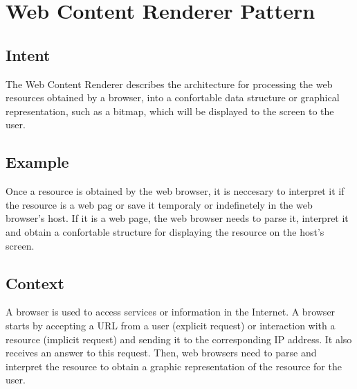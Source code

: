 \documentclass[prodmode,acmtecs]{acmsmall}
\begin{document}
\section{Web Content Renderer Pattern}

  \subsection*{Intent}

  The Web Content Renderer describes the architecture for processing the web resources obtained by a browser, into a confortable data structure \cite{gpuchrome} or graphical representation, such as a bitmap, which will be displayed to the screen to the user.

  \subsection*{Example}
  Once a resource is obtained by the web browser, it is neccesary to interpret it if the resource is a web pag or save it temporaly or indefinetely in the web browser's host. If it is a web page, the web browser needs to parse it, interpret it and obtain a confortable structure for displaying the resource on the host's screen.
  
  \subsection*{Context}
  A browser is used to access services or information in the Internet. A browser starts by accepting a URL from a user (explicit request) or interaction with a resource (implicit request) and sending it to the corresponding IP address. It also receives an answer to this request. Then, web browsers need to parse and interpret the resource to obtain a graphic representation of the resource for the user.
\end{document}
